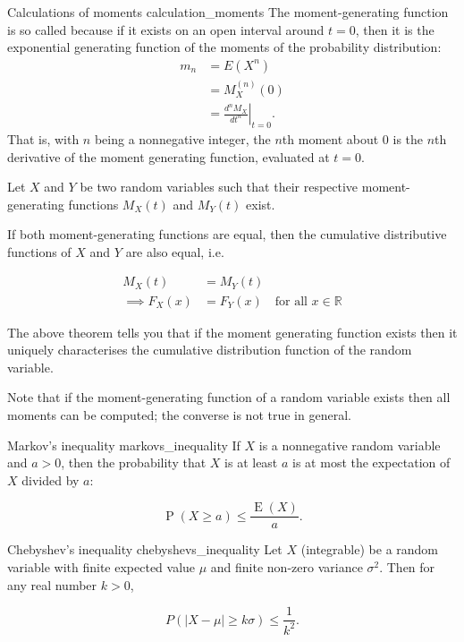 \begin{lemma}{Calculations of moments \cite{wikipedia_moment_generating_function}}{calculation_moments}
	The moment-generating function is so called because if it exists on an open interval around $t = 0$, then it is the exponential generating function of the moments of the probability distribution:
	\begin{align*}
		m_{n} &= E\left(X^{n}\right) \\
		&= M_{X}^{(n)}(0) \\
		&= \left.{\frac {d^{n}M_{X}}{dt^{n}}}\right|_{t=0} .
	\end{align*}
	That is, with $n$ being a nonnegative integer, the $n$th moment about 0 is the $n$th derivative of the moment generating function, evaluated at $t = 0$.	
\end{lemma}

\begin{theorem}{\cite{math2901_notes}}{}
	Let $X$ and $Y$ be two random variables such that their respective moment-generating functions $M_X(t)$ and $M_Y(t)$ exist.

	If both moment-generating functions are equal, then the cumulative distributive functions of $X$ and $Y$ are also equal, i.e.

	\begin{align*}
		M_X(t) &= M_Y(t) \\
		\implies F_X(x) &= F_Y(x) \quad \text{for all } x \in \mathbb{R}
	\end{align*}
\end{theorem}

The above theorem tells you that if the moment generating
function exists then it uniquely characterises the cumulative
distribution function of the random variable. \cite{math2901_notes}

Note that if the moment-generating function of a random variable exists then all moments can be computed; the converse is not true in general.

\begin{lemma}{Markov's inequality \cite{wikipedia_markovs_inequality}}{markovs_inequality}
	If $X$ is a nonnegative random variable and $a > 0$, then the probability that $X$ is at least $a$ is at most the expectation of $X$ divided by $a$:

	$$ \operatorname {P} (X\geq a)\leq {\frac {\operatorname {E} (X)}{a}} . $$
\end{lemma}

\begin{lemma}{Chebyshev's inequality \cite{wikipedia_chebyshevs_inequality}}{chebyshevs_inequality}
	Let $X$ (integrable) be a random variable with finite expected value $\mu$ and finite non-zero variance $\sigma^2$. Then for any real number $k > 0$,

	$$ P(\lvert X-\mu \rvert \geq k \sigma) \leq \frac {1}{k^{2}} . $$
\end{lemma}

